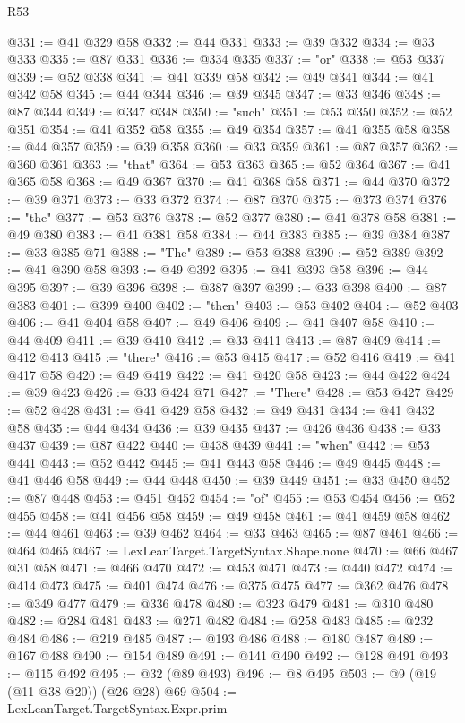 \begin{lexlean}{R53}
\begin{coremodule}
@331 := @41 @329 @58
@332 := @44 @331
@333 := @39 @332
@334 := @33 @333
@335 := @87 @331
@336 := @334 @335
@337 := "or"
@338 := @53 @337
@339 := @52 @338
@341 := @41 @339 @58
@342 := @49 @341
@344 := @41 @342 @58
@345 := @44 @344
@346 := @39 @345
@347 := @33 @346
@348 := @87 @344
@349 := @347 @348
@350 := "such"
@351 := @53 @350
@352 := @52 @351
@354 := @41 @352 @58
@355 := @49 @354
@357 := @41 @355 @58
@358 := @44 @357
@359 := @39 @358
@360 := @33 @359
@361 := @87 @357
@362 := @360 @361
@363 := "that"
@364 := @53 @363
@365 := @52 @364
@367 := @41 @365 @58
@368 := @49 @367
@370 := @41 @368 @58
@371 := @44 @370
@372 := @39 @371
@373 := @33 @372
@374 := @87 @370
@375 := @373 @374
@376 := "the"
@377 := @53 @376
@378 := @52 @377
@380 := @41 @378 @58
@381 := @49 @380
@383 := @41 @381 @58
@384 := @44 @383
@385 := @39 @384
@387 := @33 @385 @71
@388 := "The"
@389 := @53 @388
@390 := @52 @389
@392 := @41 @390 @58
@393 := @49 @392
@395 := @41 @393 @58
@396 := @44 @395
@397 := @39 @396
@398 := @387 @397
@399 := @33 @398
@400 := @87 @383
@401 := @399 @400
@402 := "then"
@403 := @53 @402
@404 := @52 @403
@406 := @41 @404 @58
@407 := @49 @406
@409 := @41 @407 @58
@410 := @44 @409
@411 := @39 @410
@412 := @33 @411
@413 := @87 @409
@414 := @412 @413
@415 := "there"
@416 := @53 @415
@417 := @52 @416
@419 := @41 @417 @58
@420 := @49 @419
@422 := @41 @420 @58
@423 := @44 @422
@424 := @39 @423
@426 := @33 @424 @71
@427 := "There"
@428 := @53 @427
@429 := @52 @428
@431 := @41 @429 @58
@432 := @49 @431
@434 := @41 @432 @58
@435 := @44 @434
@436 := @39 @435
@437 := @426 @436
@438 := @33 @437
@439 := @87 @422
@440 := @438 @439
@441 := "when"
@442 := @53 @441
@443 := @52 @442
@445 := @41 @443 @58
@446 := @49 @445
@448 := @41 @446 @58
@449 := @44 @448
@450 := @39 @449
@451 := @33 @450
@452 := @87 @448
@453 := @451 @452
@454 := "of"
@455 := @53 @454
@456 := @52 @455
@458 := @41 @456 @58
@459 := @49 @458
@461 := @41 @459 @58
@462 := @44 @461
@463 := @39 @462
@464 := @33 @463
@465 := @87 @461
@466 := @464 @465
@467 := LexLeanTarget.TargetSyntax.Shape.none
@470 := @66 @467 @31 @58
@471 := @466 @470
@472 := @453 @471
@473 := @440 @472
@474 := @414 @473
@475 := @401 @474
@476 := @375 @475
@477 := @362 @476
@478 := @349 @477
@479 := @336 @478
@480 := @323 @479
@481 := @310 @480
@482 := @284 @481
@483 := @271 @482
@484 := @258 @483
@485 := @232 @484
@486 := @219 @485
@487 := @193 @486
@488 := @180 @487
@489 := @167 @488
@490 := @154 @489
@491 := @141 @490
@492 := @128 @491
@493 := @115 @492
@495 := @32 (@89 @493)
@496 := @8 @495
@503 := @9 (@19 (@11 @38 @20)) (@26 @28) @69
@504 := LexLeanTarget.TargetSyntax.Expr.prim

\end{coremodule}
\end{lexlean}
